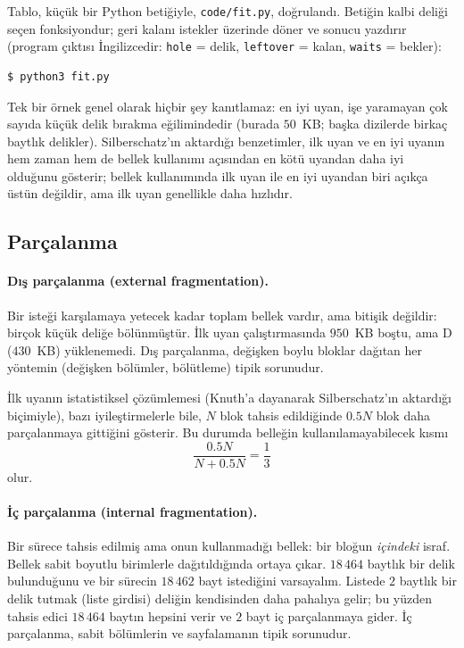 \documentclass[11pt,a4paper]{article}
\begin{document}
Tablo, küçük bir Python betiğiyle, \texttt{code/fit.py}, doğrulandı. Betiğin kalbi deliği seçen fonksiyondur; geri kalanı istekler üzerinde döner ve sonucu yazdırır (program çıktısı İngilizcedir: \texttt{hole} = delik, \texttt{leftover} = kalan, \texttt{waits} = bekler):



\begin{lstlisting}[style=term]
$ python3 fit.py
\end{lstlisting}
\vspace{-0.9em}


Tek bir örnek genel olarak hiçbir şey kanıtlamaz: en iyi uyan, işe yaramayan çok sayıda küçük delik bırakma eğilimindedir (burada $50$~KB; başka dizilerde birkaç baytlık delikler). Silberschatz'ın aktardığı benzetimler, ilk uyan ve en iyi uyanın hem zaman hem de bellek kullanımı açısından en kötü uyandan daha iyi olduğunu gösterir; bellek kullanımında ilk uyan ile en iyi uyandan biri açıkça üstün değildir, ama ilk uyan genellikle daha hızlıdır.

\subsection{Parçalanma}

\paragraph{Dış parçalanma (external fragmentation).} Bir isteği karşılamaya yetecek kadar toplam bellek vardır, ama bitişik değildir: birçok küçük deliğe bölünmüştür. İlk uyan çalıştırmasında $950$~KB boştu, ama D ($430$~KB) yüklenemedi. Dış parçalanma, değişken boylu bloklar dağıtan her yöntemin (değişken bölümler, bölütleme) tipik sorunudur.

\begin{keyidea}[\%50 kuralı]
İlk uyanın istatistiksel çözümlemesi (Knuth'a dayanarak Silberschatz'ın aktardığı biçimiyle), bazı iyileştirmelerle bile, $N$ blok tahsis edildiğinde $0.5N$ blok daha parçalanmaya gittiğini gösterir. Bu durumda belleğin kullanılamayabilecek kısmı
\[
\frac{0.5N}{N + 0.5N} = \frac{1}{3}
\]
olur.
\end{keyidea}

\paragraph{İç parçalanma (internal fragmentation).} Bir sürece tahsis edilmiş ama onun kullanmadığı bellek: bir bloğun \emph{içindeki} israf. Bellek sabit boyutlu birimlerle dağıtıldığında ortaya çıkar. $18\,464$ baytlık bir delik bulunduğunu ve bir sürecin $18\,462$ bayt istediğini varsayalım. Listede $2$ baytlık bir delik tutmak (liste girdisi) deliğin kendisinden daha pahalıya gelir; bu yüzden tahsis edici $18\,464$ baytın hepsini verir ve $2$ bayt iç parçalanmaya gider. İç parçalanma, sabit bölümlerin ve sayfalamanın tipik sorunudur.
\end{document}
